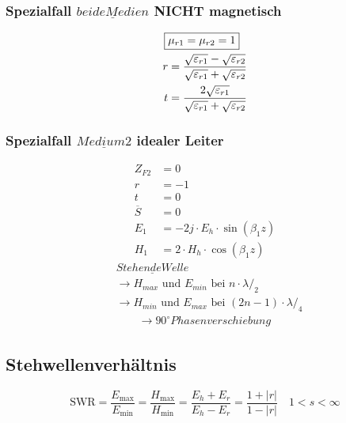 \subsubsection{Spezialfall $\underline{beide Medien}$ NICHT magnetisch}
\begin{align*}
    \Aboxed{ & \mu_{r1} = \mu_{r2} = 1}                                                                                    \\
    r        & = \frac{\sqrt{\varepsilon_{r1}}-\sqrt{\varepsilon_{r2}}}{{\sqrt{\varepsilon_{r1}}+\sqrt{\varepsilon_{r2}}}} \\
    t        & = \frac{2\sqrt{\varepsilon_{r1}}}{\sqrt{\varepsilon_{r1}}+\sqrt{\varepsilon_{r2}}}
\end{align*}

\subsubsection{Spezialfall $\underline{Medium 2}$ idealer Leiter}
\begin{align*}
    Z_{F2}       & = 0                                 \\
    r            & = -1                                \\
    t            & = 0                                 \\
    \overline{S} & = 0                                 \\
    E_1          & = -2j\cdot E_h\cdot \sin(\beta_1 z) \\
    H_1          & = 2\cdot H_h\cdot \cos(\beta_1 z)
\end{align*}
\begin{align*}
     & \underline{Stehende Welle}                                              \\
     & \rightarrow \text{$H_{max}$ und $E_{min}$ bei } n \cdot \lambda/_2      \\
     & \rightarrow \text{$H_{min}$ und $E_{max}$ bei } (2n-1) \cdot \lambda/_4 \\
     & \qquad \rightarrow 90^\circ Phasenverschiebung
\end{align*}

\subsection{Stehwellenverhältnis}
\[
    \mathrm{SWR} = \frac{E_{\max}}{E_{\min}}=\frac{H_{\max}}{H_{\min}}=\frac{E_{h}+E_{r}}{E_{h}-E_{r}} = \frac{1+|r|}{1-|r|} \quad 1<s<\infty
\]

\newpage



